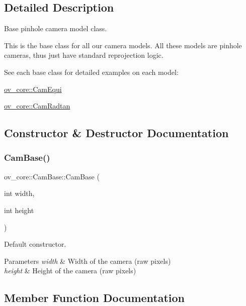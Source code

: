 \subsection{Detailed Description}
Base pinhole camera model class. 

This is the base class for all our camera models. All these models are pinhole cameras, thus just have standard reprojection logic.

See each base class for detailed examples on each model\+:
\begin{DoxyItemize}
\item \hyperlink{classov__core_1_1CamEqui}{ov\+\_\+core\+::\+Cam\+Equi}
\item \hyperlink{classov__core_1_1CamRadtan}{ov\+\_\+core\+::\+Cam\+Radtan} 
\end{DoxyItemize}

\subsection{Constructor \& Destructor Documentation}
\mbox{\label{classov__core_1_1CamBase_a1f11a6e4e8324d6843b578c0dabe0f94}} 
\subsubsection{\texorpdfstring{Cam\+Base()}{CamBase()}}
{\footnotesize\ttfamily ov\+\_\+core\+::\+Cam\+Base\+::\+Cam\+Base (\begin{DoxyParamCaption}\item[{int}]{width,  }\item[{int}]{height }\end{DoxyParamCaption})\hspace{0.3cm}{\ttfamily [inline]}}



Default constructor. 


\begin{DoxyParams}{Parameters}
{\em width} & Width of the camera (raw pixels) \\
\hline
{\em height} & Height of the camera (raw pixels) \\
\hline
\end{DoxyParams}


\subsection{Member Function Documentation}
\mbox{\label{classov__core_1_1CamBase_a498fa2b56be008d7b59bf9927f60d5db}} 
